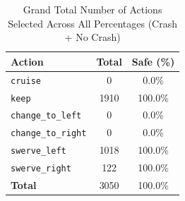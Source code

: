 \documentclass{article}
\begin{document}
\begin{table}[h]
\centering
\caption{Grand Total Number of Actions Selected Across All Percentages (Crash + No Crash)}
\begin{tabular}{l|c|c}
\toprule
Action & Total & Safe (\%) \\
\midrule
\texttt{cruise} & 0 & 0.0\% \\ 
\texttt{keep} & 1910 & 100.0\% \\ 
\texttt{change\_to\_left} & 0 & 0.0\% \\ 
\texttt{change\_to\_right} & 0 & 0.0\% \\ 
\texttt{swerve\_left} & 1018 & 100.0\% \\ 
\texttt{swerve\_right} & 122 & 100.0\% \\ 
\midrule
\textbf{Total} & 3050 & 100.0\% \\ 
\bottomrule
\end{tabular}
\end{table}
\end{document}
